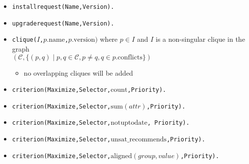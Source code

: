 \documentclass[a4paper,english]{article}
\newcommand{\closure}{\mathcal{C}}
\newcommand{\name}{\mathrm{name}}
\newcommand{\version}{\mathrm{version}}
\newcommand{\conflicts}{\mathrm{conflicts}}
\newcommand{\funsatrecom}{\mathrm{unsat\_recommends}}
\newcommand{\fcount}{\mathrm{count}}
\newcommand{\fsum}{\mathrm{sum}}
\newcommand{\faligned}{\mathrm{aligned}}
\newcommand{\fnotuptodate}{\mathrm{notuptodate}}
\newcommand{\attr}[1]{\mathit{#1}}
\begin{document}
\begin{itemize}
\begin{itemize}
    \end{itemize}
  \item \texttt{installrequest(Name,Version).}
  \item \texttt{upgraderequest(Name,Version).}
  \item 
    \texttt{clique($I$,$p.\name$,$p.\version)$} where $p\in I$ and $I$ is a non-singular clique in the graph\\
    $(\closure, \{ (p,q) \mid p,q\in\closure, p\neq q, q\in p.\conflicts \})$
    \begin{itemize}
      \item no overlapping cliques will be added
    \end{itemize}
  \item \texttt{criterion(Maximize,Selector,$\fcount$,Priority).}
  \item \texttt{criterion(Maximize,Selector,$\fsum(\attr{attr})$,Priority).}
  \item \texttt{criterion(Maximize,Selector,$\fnotuptodate$, Priority).}
  \item \texttt{criterion(Maximize,Selector,$\funsatrecom$,Priority).}
  \item \texttt{criterion(Maximize,Selector,$\faligned(\attr{group},\attr{value})$,Priority).}
\end{itemize}
\end{document}
